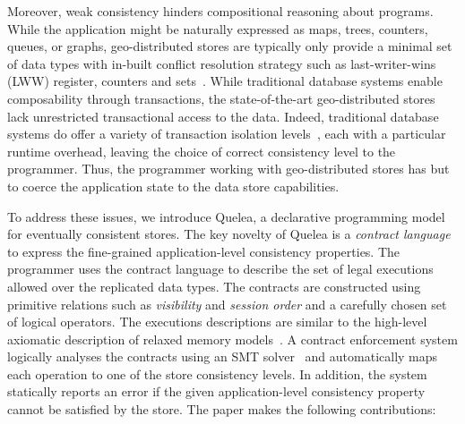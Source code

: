 Moreover, weak consistency hinders compositional reasoning about programs.
While the application might be naturally expressed as maps, trees, counters,
queues, or graphs, geo-distributed stores are typically only provide a minimal
set of data types with in-built conflict resolution strategy such as
last-writer-wins (LWW) register, counters and sets~\cite{Cassandra,DynamoDB}.
While traditional database systems enable composability through transactions,
the state-of-the-art geo-distributed stores lack unrestricted transactional
access to the data. Indeed, traditional database systems do offer a variety of
transaction isolation levels~\cite{}, each with a particular runtime overhead,
leaving the choice of correct consistency level to the programmer. Thus, the
programmer working with geo-distributed stores has but to coerce the
application state to the data store capabilities.

To address these issues, we introduce Quelea, a declarative programming model
for eventually consistent stores. The key novelty of Quelea is a \emph{contract
language} to express the fine-grained application-level consistency properties.
The programmer uses the contract language to describe the set of legal
executions allowed over the replicated data types. The contracts are
constructed using primitive relations such as \emph{visibility} and
\emph{session order} and a carefully chosen set of logical operators. The
executions descriptions are similar to the high-level axiomatic description of
relaxed memory models~\cite{Demange2013}. A contract enforcement system
logically analyses the contracts using an SMT solver~\cite{} and automatically
maps each operation to one of the store consistency levels. In addition, the
system statically reports an error if the given application-level consistency
property cannot be satisfied by the store. The paper makes the following
contributions:

